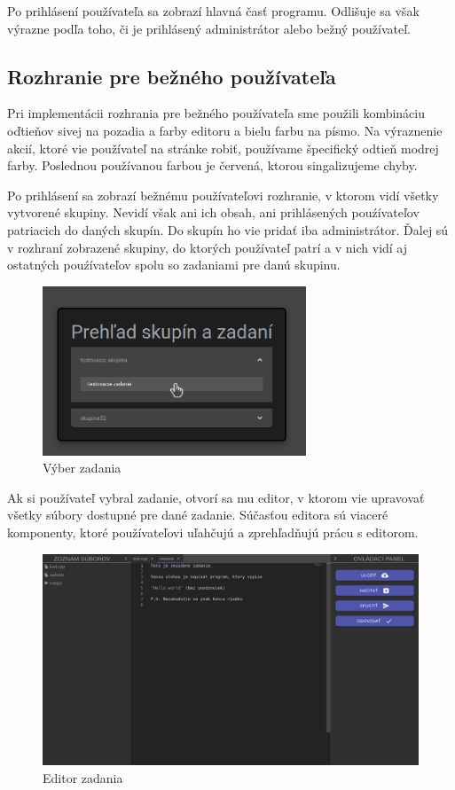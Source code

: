 Po prihlásení používateľa sa zobrazí hlavná časť programu. Odlišuje sa však výrazne podľa toho, či
je prihlásený administrátor alebo bežný používateľ.

\subsection{Rozhranie pre bežného používateľa}
Pri implementácii rozhrania pre bežného používateľa sme použili kombináciu oďtieňov sivej na pozadia
a farby editoru a bielu farbu na písmo. Na výraznenie akcií, ktoré vie používateľ na stránke robiť,
používame špecifický odtieň modrej farby. Poslednou používanou farbou je červená, ktorou
singalizujeme chyby.

Po prihlásení sa zobrazí bežnému používateľovi rozhranie, v ktorom vidí všetky vytvorené skupiny.
Nevidí však ani ich obsah, ani prihlásených pouźívateľov patriacich do daných skupín. Do skupín
ho vie pridať iba administrátor. Ďalej sú v rozhraní zobrazené skupiny, do ktorých používateľ patrí
a v nich vidí aj ostatných pouźívateľov spolu so zadaniami pre danú skupinu.
\begin{figure}[H]
\centerline{\includegraphics[width=0.7\textwidth]{images/vyber_zadania}}
\caption[Výber zadania]{Výber zadania}
\label{obr:vyber_zadania}
\end{figure}

Ak si používateľ vybral zadanie, otvorí sa mu editor, v ktorom vie upravovať všetky súbory dostupné
pre dané zadanie. Súčasťou editora sú viaceré komponenty, ktoré používateľovi uľahčujú a
zprehľadňujú prácu s editorom. 
\begin{figure}[H]
\centerline{\includegraphics[width=1\textwidth]{images/bezny_pouzivatel}}
\caption[Editor zadania]{Editor zadania}
\label{obr:bezny_pouzivatel}
\end{figure}

